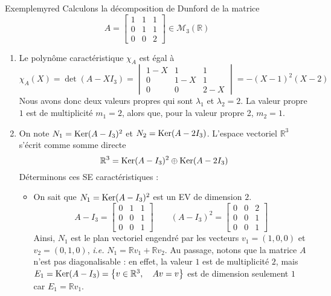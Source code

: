     \begin{omed}{Exemple}{myred}
        Calculons la décomposition de Dunford de la matrice 
        \[ A = \begin{bmatrix}
            1 & 1 & 1 \\
            0 & 1 & 1 \\
            0 & 0 & 2
        \end{bmatrix} \in \mathcal{M}_3(\mathbb{R}) \]   
        \begin{enumerate}
            \item Le polynôme caractéristique $\chi_A$ est égal à 
            \[ \chi_A(X) = \det(A - X I_3) = \begin{vmatrix}
                1 - X & 1 & 1 \\
                0 & 1- X & 1 \\
                0 & 0 & 2- X
            \end{vmatrix} = -(X-1)^2(X-2) \]   
            Nous avons donc deux valeurs propres qui sont $\lambda_1$ et $\lambda_2 = 2$. La valeur propre $1$ est de multiplicité $m_1 = 2$, alors que, pour la valeur propre 2, $m_2 = 1$.
            \item On note $N_1 = \operatorname{Ker}(A - I_3)^2$ et $N_2 = \operatorname{Ker}(A - 2 I_3)$. L’espace vectoriel $\mathbb{R}^3$ s’écrit comme somme directe 
            \[ \mathbb{R}^3 = \operatorname{Ker}(A - I_3)^2 \oplus \operatorname{Ker}(A - 2 I_3) \]    
            Déterminons ces SE caractéristiques : 
            \begin{itemize}
                \item On sait que $N_1 = \operatorname{Ker}(A - I_3)^2$ est un EV de dimension $2$. 
                \[ A - I_3 = \begin{bmatrix}
                    0 & 1 & 1 \\
                    0 & 0 & 1 \\
                    0 & 0 & 1
                \end{bmatrix} \qquad (A - I_3)^2 = \begin{bmatrix}
                    0 & 0 & 2 \\
                    0 & 0 & 1 \\
                    0 & 0 & 1
                \end{bmatrix} \]   
                Ainsi, $N_1$ est le plan vectoriel engendré par les vecteurs $v_1 = (1,0,0)$ et $v_2 = (0,1,0)$, \textit{i.e.} $N_1 = \mathbb{R} v_1 + \mathbb{R} v_2$. Au passage, notons que la matrice $A$ n’est pas diagonalisable : en effet, la valeur $1$ est de multiplicité $2$, mais $E_1 = \operatorname{Ker}(A - I_3) = \left\{v \in \mathbb{R}^3, \quad Av = v\right\}$ est de dimension seulement $1$ car $E_1 = \mathbb{R} v_1$.

\end{itemize}
\end{enumerate}
\end{omed}
